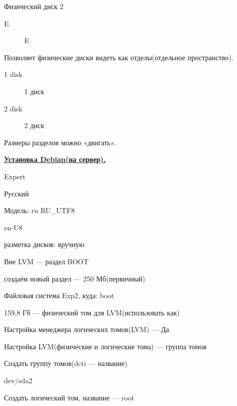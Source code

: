 \par 
Физический диск 2
\begin{description}
\item [E] E	
	
\end{description}
\par 
Позволяет физические диски
видеть как отделы(отдельное пространство).
\par 


\begin{description}
\item [1 disk] 1 диск
\item [2 disk] 2 диск
			
		
	
\end{description}
\par 
Размеры разделов можно «двигать».
\par 


\par 
\underline{\textbf{Установка Debian(на сервер).}}
\par 
Expert
\par 
Русский
\par 
Модель: ru RU\_UTF8
\par 
en-U8
\par 
разметка дисков: вручную
\par 
Вне LVM — раздел BOOT
\par 
создаём новый раздел — 250
Мб(первичный)
\par 
Файловая система Exp2, куда: boot
\par 
159,8 Гб — физический том для LVM(использовать
как)
\par 
Настройка менеджера логических томов(LVM)
— Да.
\par 
Настройка LVM(физические и логические
тома) — группа томов
\par 
Создать группу томов(dcti — название)
\par 
dev/sda2
\par 
Создать логический том, название — root


